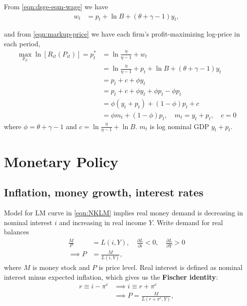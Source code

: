\documentclass[../main.tex]{subfiles}
\begin{document}
        From \eqref{eqn:dsge-eqm-wage} we have
        \begin{align}
            w_t &= p_t + \ln{B} + (\theta + \gamma - 1) y_t,
        \end{align}
        
        and from \eqref{eqn:markup-price} we have each firm's profit-maximizing log-price in each period,
        \begin{align}
            \max_{p_{it}}\ln[R_{it}(P_{it})]
            = p_t^* &= \ln{\frac{\eta}{\eta - 1}} + w_t
            \\
            &= \ln{\frac{\eta}{\eta - 1}}
            + p_t + \ln{B} + (\theta + \gamma - 1) y_t
            \\
            &= p_t + c + \phi y_t
            \\
            &= p_t + c + \phi y_t + \phi p_t - \phi p_t
            \\
            &= \phi (y_t + p_t) + (1-\phi) p_t + c
            \\
            &= \phi m_t + (1-\phi) p_t, \quad m_t = y_t + p_t, \quad c = 0
        \end{align}
        where $\phi = \theta + \gamma - 1$ and $c = \ln{\frac{\eta}{\eta - 1}} + \ln{B}$. $m_t$ is log nominal GDP $y_t + p_t$.
        
    \setcounter{section}{1}
    \renewcommand{\thesection}{\arabic{chapter}.\arabic{section}}
    
    \chapter{Monetary Policy}
    
        \section{Inflation, money growth, interest rates}
        
        Model for LM curve in \eqref{eqn:NKLM} implies real money demand is decreasing in nominal interest $i$ and increasing in real income $Y$. Write demand for real balances
        \begin{align}
            \frac{M}{P} &= L(i, Y),
            \quad \frac{\partial L}{\partial i} < 0,
            \quad \frac{\partial L}{\partial Y} > 0
            \\
            \implies
            P &= \frac{M}{L(i, Y)},
        \end{align}
        where $M$ is money stock and $P$ is price level. Real interest is defined as nominal interest minus expected inflation, which gives us the \textbf{Fischer identity}:
        \begin{align}
            r \equiv i - \pi^e
            &\implies
            i \equiv r + \pi^e
            \label{eqn:fischer-identity}
            \\
            &\implies
            P = \frac{M}{L(r + \pi^e, Y)},
        \end{align}
        
\end{document}
